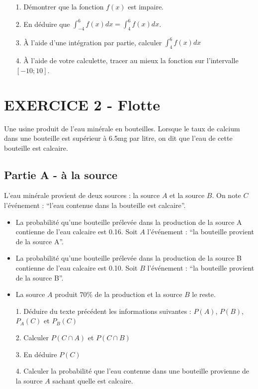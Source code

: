 \documentclass[12pt]{article}
\begin{document}
\begin{enumerate}
\item[1.] Démontrer que la fonction $f(x)$ est impaire.
\item[2.] En déduire que $\int_{-4}^{6} f(x) dx = \int_{4}^{6} f(x) dx$.
\item[3.] À l'aide d'une intégration par partie, calculer $\int_{4}^{6} f(x) dx$
\item[4.] À l'aide de votre calculette, tracer au mieux la fonction sur l'intervalle $[-10 ; 10]$.
\end{enumerate}

\begin{figure}[H]
  \centering
\end{figure}

\newpage
\section*{EXERCICE 2 - Flotte} %
Une usine produit de l'eau minérale en bouteilles. Lorsque le taux de calcium  dans une bouteille est supérieur à 6.5mg par litre, on dit que l'eau de cette bouteille est calcaire.

\subsection*{Partie A - à la source}

L'eau minérale provient de deux sources : la source $A$ et la source $B$. On note $C$ l'événement : ``l'eau contenue dans la bouteille est calcaire''.

\begin{itemize}
\item La probabilité qu'une bouteille prélevée dans la production de la source A contienne de l'eau calcaire est 0.16. Soit $A$ l'événement : ``la bouteille provient de la source A''.
\item La probabilité qu'une bouteille prélevée dans la production de la source B contienne de l'eau calcaire est 0.10. Soit $B$ l'événement : ``la bouteille provient de la source B''.
\item La source $A$ produit $70\%$ de la production et la source $B$ le reste.
\end{itemize}

\begin{enumerate}
\item[1.]  Déduire du texte précédent les informations suivantes : $P(A)$, $P(B)$,  $P_A(C)$ et  $P_B(C)$
\item[2.] Calculer $P(C \cap A)$ et $P(C \cap B)$
\item[3.] En déduire $P(C)$
\item[4.] Calculer la probabilité que l'eau contenue dans une bouteille provienne de la source $A$ sachant quelle est calcaire.
\end{enumerate}
\end{document}
